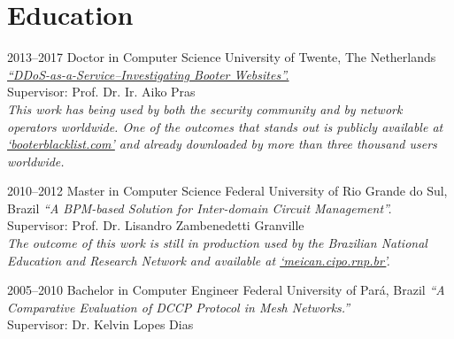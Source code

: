\documentclass[print]{styles/friggeri-cv-linux} %
\begin{document}


\setlength\parindent{0pt}
\section{Education}\vspace{-5pt}

\begin{entrylist}

\entry
{2013--2017}
{Doctor {\normalfont in Computer Science}}
{University of Twente, The Netherlands}
{\emph{\href{https://research.utwente.nl/files/18494043/jjsantanna_thesis.pdf}{``DDoS-as-a-Service--Investigating Booter Websites''.}} \\
Supervisor: Prof. Dr. Ir. Aiko Pras\\	
\textit{This work has being used by both the security community and by
network operators worldwide. One of the outcomes that stands out is publicly available at \href{http://booterblacklist.com}{`booterblacklist.com'} and  already downloaded by more than three thousand users worldwide.}}

\entry
{2010--2012}
{Master {\normalfont in Computer Science}}
{Federal University of Rio Grande do Sul, Brazil}
{\emph{``A BPM-based Solution for Inter-domain Circuit Management''.}\\
Supervisor: Prof. Dr. Lisandro Zambenedetti Granville\\
\textit{The outcome of this work is still in production used by the Brazilian
National Education and Research Network and available at
\href{http://meican.cipo.rnp.br/}{`meican.cipo.rnp.br'}.}}

\entry
{2005--2010}
{Bachelor {\normalfont in Computer Engineer}}
{Federal University of Par\'a, Brazil}
{\emph{``A Comparative Evaluation of DCCP Protocol in Mesh Networks.''} \\ 
Supervisor: Dr. Kelvin Lopes Dias
}

\end{entrylist}

\end{document}
